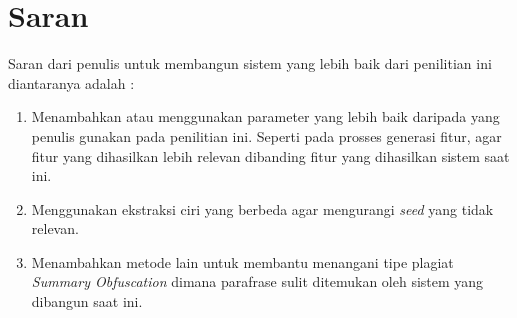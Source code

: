 \documentclass[../Book.tex]{subfiles}
\begin{document}
\section{Saran}

Saran dari penulis untuk membangun sistem yang lebih baik dari penilitian ini diantaranya adalah : 

\begin{enumerate}
	\item Menambahkan atau menggunakan parameter yang lebih baik daripada yang penulis gunakan pada penilitian ini. Seperti pada prosses generasi fitur, agar fitur yang dihasilkan lebih relevan dibanding fitur yang dihasilkan sistem saat ini.
	\item Menggunakan ekstraksi ciri yang berbeda agar mengurangi \textit{seed} yang tidak relevan.
	\item Menambahkan metode lain untuk membantu menangani tipe plagiat \textit{Summary Obfuscation} dimana parafrase sulit ditemukan oleh sistem yang dibangun saat ini.
\end{enumerate}
\end{document}
